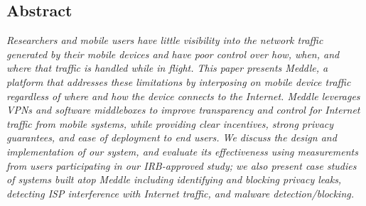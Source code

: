 \subsection*{Abstract}
{\it Researchers and mobile users have little visibility into the network 
traffic generated by their mobile devices and have poor control over 
how, when, and where that traffic is handled while in flight. 
This paper presents Meddle, a platform that 
addresses these limitations by interposing on mobile 
device traffic regardless of where and how the device connects to the Internet.
Meddle leverages 
VPNs and software middleboxes to improve transparency and control 
for Internet traffic from mobile systems, while providing clear incentives, strong privacy guarantees, 
and ease of deployment to end users. We discuss 
the design and implementation of our system, and evaluate its effectiveness using 
measurements from users participating in our IRB-approved study; we also present case studies of systems built atop Meddle including
identifying and blocking privacy leaks, detecting ISP interference with Internet traffic, and malware detection/blocking.
}






